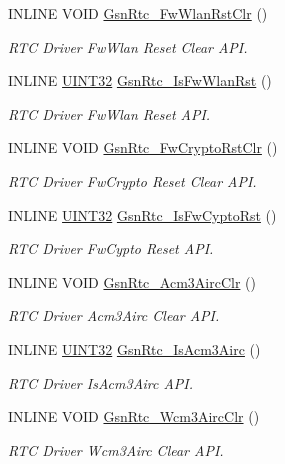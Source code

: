 \begin{DoxyCompactItemize}
INLINE VOID \hyperlink{a00651_ga8a8abb14d43d7af443c2e07b342b3f4e}{GsnRtc\_\-FwWlanRstClr} ()
\begin{DoxyCompactList}\small\item\em RTC Driver FwWlan Reset Clear API. \end{DoxyCompactList}\item 
INLINE \hyperlink{a00660_gae1e6edbbc26d6fbc71a90190d0266018}{UINT32} \hyperlink{a00651_ga54506f747cfe33c09c82f934cf1d6cbc}{GsnRtc\_\-IsFwWlanRst} ()
\begin{DoxyCompactList}\small\item\em RTC Driver FwWlan Reset API. \end{DoxyCompactList}\item 
INLINE VOID \hyperlink{a00651_ga69571c7ee93a3ed18f576557ea11b910}{GsnRtc\_\-FwCryptoRstClr} ()
\begin{DoxyCompactList}\small\item\em RTC Driver FwCrypto Reset Clear API. \end{DoxyCompactList}\item 
INLINE \hyperlink{a00660_gae1e6edbbc26d6fbc71a90190d0266018}{UINT32} \hyperlink{a00651_ga1da3332c034dc38aadd907988b6d9042}{GsnRtc\_\-IsFwCyptoRst} ()
\begin{DoxyCompactList}\small\item\em RTC Driver FwCypto Reset API. \end{DoxyCompactList}\item 
INLINE VOID \hyperlink{a00651_gad04bf17aa8b0e9b43f4634141f96cad8}{GsnRtc\_\-Acm3AircClr} ()
\begin{DoxyCompactList}\small\item\em RTC Driver Acm3Airc Clear API. \end{DoxyCompactList}\item 
INLINE \hyperlink{a00660_gae1e6edbbc26d6fbc71a90190d0266018}{UINT32} \hyperlink{a00651_ga5c05ee5001b9f01bbc6a53013e19ad45}{GsnRtc\_\-IsAcm3Airc} ()
\begin{DoxyCompactList}\small\item\em RTC Driver IsAcm3Airc API. \end{DoxyCompactList}\item 
INLINE VOID \hyperlink{a00651_ga632c40dd335598894425055eea63c026}{GsnRtc\_\-Wcm3AircClr} ()
\begin{DoxyCompactList}\small\item\em RTC Driver Wcm3Airc Clear API. \end{DoxyCompactList}\item 

\end{DoxyCompactItemize}
